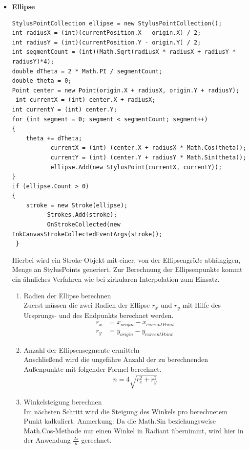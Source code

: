 \begin{itemize}
\item \textbf{Ellipse}\\ 
\begin{lstlisting}[language = CSharp, captionpos=b, caption={Ellipse in Strokes konvertieren}]
StylusPointCollection ellipse = new StylusPointCollection();
int radiusX = (int)(currentPosition.X - origin.X) / 2;
int radiusY = (int)(currentPosition.Y - origin.Y) / 2;
int segmentCount = (int)(Math.Sqrt(radiusX * radiusX + radiusY * radiusY)*4);
double dTheta = 2 * Math.PI / segmentCount;
double theta = 0;
Point center = new Point(origin.X + radiusX, origin.Y + radiusY);                        
 int currentX = (int) center.X + radiusX;
int currentY = (int) center.Y;
for (int segment = 0; segment < segmentCount; segment++)
{
	theta += dTheta;
           currentX = (int) (center.X + radiusX * Math.Cos(theta));
           currentY = (int) (center.Y + radiusY * Math.Sin(theta));
           ellipse.Add(new StylusPoint(currentX, currentY));
}
if (ellipse.Count > 0)
{
	stroke = new Stroke(ellipse);
          Strokes.Add(stroke);
          OnStrokeCollected(new InkCanvasStrokeCollectedEventArgs(stroke));
 }
\end{lstlisting}
Hierbei wird ein Stroke-Objekt mit einer, von der Ellipsengröße abhängigen, Menge an StylusPoints generiert. Zur Berechnung der Ellipsenpunkte kommt ein ähnliches Verfahren wie bei zirkularen Interpolation zum Einsatz.
\begin{enumerate}
\item Radien der Ellipse berechnen\\
Zuerst müssen die zwei Radien der Ellipse $r_x$ und $r_y$ mit Hilfe des Ursprungs- und des Endpunkts berechnet werden.
\begin{align}
r_x &= x_{origin} - x_{currentPoint}\\
r_y &= y_{origin} - y_{currentPoint}
\end{align}
\item Anzahl der Ellipsensegmente ermitteln\\
Anschließend wird die ungefähre Anzahl der zu berechnenden Außenpunkte mit folgender Formel berechnet.
\begin{align}
n = 4 \sqrt{r_x^2+r_y^2}
\end{align}
\item Winkelsteigung berechnen\\
Im nächsten Schritt wird die Steigung des Winkels pro berechnetem Punkt kalkuliert.
Anmerkung: Da die Math.Sin beziehungsweise Math.Cos-Methode nur einen Winkel in Radiant übernimmt, wird hier in der Anwendung $\frac{2\pi}{n}$ gerechnet.

\end{enumerate}
\end{itemize}

